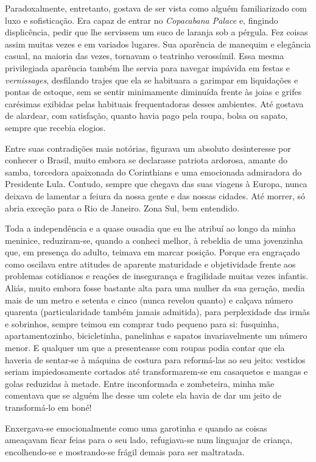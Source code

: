Paradoxalmente, entretanto, gostava de ser vista como alguém familiarizado com luxo e sofisticação.
Era capaz de entrar no \textit{Copacabana Palace} e, fingindo displicência, pedir que lhe servissem um suco de laranja sob a pérgula.
Fez coisas assim muitas vezes e em variados lugares.
Sua aparência de manequim e elegância casual, na maioria das vezes, tornavam o teatrinho verossímil.
Essa mesma privilegiada aparência também lhe servia para navegar impávida em festas e \textit{vernissages}, desfilando trajes que ela se habituara a garimpar em liquidações e pontas de estoque, sem se sentir minimamente diminuída frente às joias e grifes carésimas exibidas pelas habituais frequentadoras desses ambientes.
Até gostava de alardear, com satisfação, quanto havia pago pela roupa, bolsa ou sapato, sempre que recebia elogios.


Entre suas contradições mais notórias, figurava um absoluto desinteresse por conhecer o Brasil, muito embora se declarasse patriota ardorosa, amante do samba, torcedora apaixonada do Corinthians e uma emocionada admiradora do Presidente Lula.
Contudo, sempre que chegava das suas viagens à Europa, nunca deixava de lamentar a feiura da nossa gente e das nossas cidades.
Até morrer, só abria exceção para o Rio de Janeiro.
Zona Sul, bem entendido.

Toda a independência e a quase ousadia que eu lhe atribuí ao longo da minha meninice, reduziram-se, quando a conheci melhor, à rebeldia de uma jovenzinha que, em presença do adulto, teimava em marcar posição.
Porque era engraçado como oscilava entre atitudes de aparente maturidade e objetividade frente aos problemas cotidianos e reações de insegurança e fragilidade muitas vezes infantis.
Aliás, muito embora fosse bastante alta para uma mulher da sua geração, media mais de um metro e setenta e cinco (nunca revelou quanto) e calçava número quarenta (particularidade também jamais admitida), para perplexidade das irmãs e sobrinhos, sempre teimou em comprar tudo pequeno para si: fusquinha, apartamentozinho, bicicletinha, panelinhas e sapatos invariavelmente um número menor.
E qualquer um que a presenteasse com roupas podia contar que ela haveria de sentar-se à máquina de costura para reformá-las ao seu jeito: vestidos seriam impiedosamente cortados até transformarem-se em casaquetos e mangas e golas reduzidas à metade.
Entre inconformada e zombeteira, minha mãe comentava que se alguém lhe desse um colete ela havia de dar um jeito de transformá-lo em boné! 

 Enxergava-se emocionalmente como uma garotinha e quando as coisas ameaçavam ficar feias para o seu lado, refugiava-se num linguajar de criança, encolhendo-se e mostrando-se frágil demais para ser maltratada.

